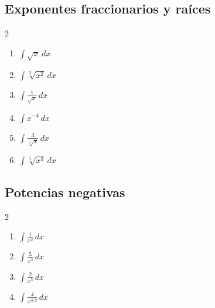 \documentclass[12pt, letterpaper]{article}
\newcommand{\dx}{\,dx}
\begin{document}
\subsection{Exponentes fraccionarios y raíces}

\begin{multicols}{2}
\begin{enumerate}[label=\textbf{\arabic*.}, leftmargin=*, itemsep=10pt, start=7]

  \item \facil\quad $\displaystyle\int \sqrt{x}\dx$

  \item \facil\quad $\displaystyle\int \sqrt[3]{x^2}\dx$

  \item \medio\quad $\displaystyle\int \frac{1}{\sqrt{x}}\dx$

  \item \medio\quad $\displaystyle\int x^{-4}\dx$

  \item \medio\quad $\displaystyle\int \frac{3}{\sqrt[4]{x}}\dx$

  \item \medio\quad $\displaystyle\int \sqrt[5]{x^3}\dx$

\end{enumerate}
\end{multicols}

\subsection{Potencias negativas}

\begin{multicols}{2}
\begin{enumerate}[label=\textbf{\arabic*.}, leftmargin=*, itemsep=10pt, start=13]

  \item \medio\quad $\displaystyle\int \frac{1}{x^2}\dx$

  \item \medio\quad $\displaystyle\int \frac{5}{x^3}\dx$

  \item \medio\quad $\displaystyle\int \frac{2}{x^5}\dx$

  \item \dificil\quad $\displaystyle\int \frac{4}{x^{3/2}}\dx$

\end{enumerate}
\end{multicols}
\end{document}
